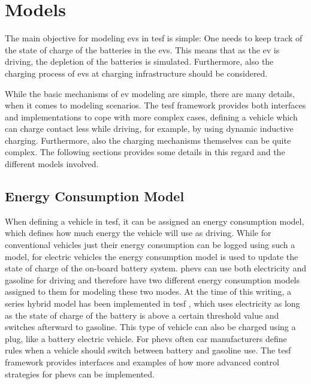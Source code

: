 \section{Models}
The main objective for modeling \glspl{ev} in \gls{tesf} is simple: One needs to keep track of the state of charge of the batteries in the \glspl{ev}. This means that as the \gls{ev} is driving, the depletion of the batteries is simulated. Furthermore, also the charging process of \glspl{ev} at charging infrastructure should be considered.

While the basic mechanisms of \gls{ev} modeling are simple, there are many details, when it comes to modeling scenarios. The \gls{tesf} framework provides both interfaces and implementations to cope with more complex cases, \eg defining a vehicle which can charge contact less while driving, for example, by using dynamic inductive charging. Furthermore, also the charging mechanisms themselves can be quite complex. The following sections provides some details in this regard and the different models involved.

\subsection{Energy Consumption Model}
When defining a vehicle in \gls{tesf}, it can be assigned an energy consumption model, which defines how much energy the vehicle will use as driving. While for conventional vehicles just their energy consumption can be logged using such a model, for electric vehicles the energy consumption model is used to update the state of charge of the on-board battery system. \glspl{phev} can use both electricity and gasoline for driving and therefore have two different energy consumption models assigned to them for modeling these two modes. At the time of this writing, a series hybrid model has been implemented in \gls{tesf} \citep[][]{Chan_PIEEE_2007}, which uses electricity as long as the state of charge of the battery is above a certain threshold value and switches afterward to gasoline. This type of vehicle can also be charged using a plug, like a battery electric vehicle. For \glspl{phev} often car manufacturers define rules when a vehicle should switch between battery and gasoline use. The \gls{tesf} framework provides interfaces and examples of how more advanced control strategies for \glspl{phev} can be implemented.

